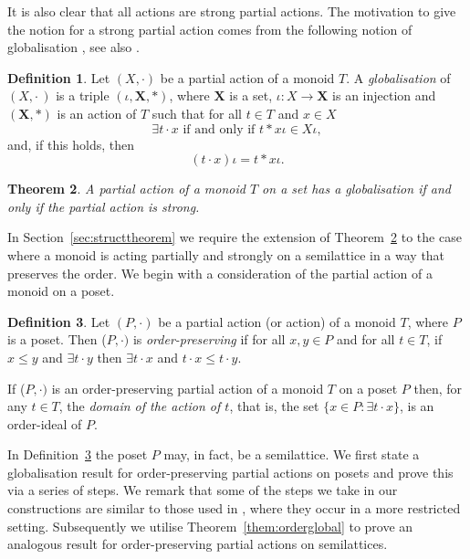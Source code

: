 \documentclass[12pt]{amsart}
\newtheorem{them}{Theorem}[section]
\theoremstyle{definition}
\newtheorem{defn}[them]{Definition}
\theoremstyle{definition}
\numberwithin{them}{section}
\numberwithin{equation}{section}
\begin{document}
It is also clear that all actions are strong partial actions. The motivation to give the notion for a strong partial action comes from the following notion of globalisation \cite{meg:2004}, see also \cite{hollings:2007}.

\begin{defn} \label{defn:global}  Let $(X,\cdot)$ be a partial action of a monoid  $T$.   A {\em globalisation} of  $(X,\cdot\,)$ is  a triple $(\iota, \mathbf{X}, \ast)$, where  $\mathbf{X}$ is a set, $\iota:X\rightarrow \mathbf{X}$ is an injection 
and $(\mathbf{X},\ast)$ is an action of   $T$  such that for all $t\in T$ and $x\in X$
\[\exists t\cdot x\mbox{ if and only if }t\ast x\iota\in X\iota,\]
and, if this holds, then
\[(t\cdot x)\iota=t\ast x\iota.\] \end{defn}

\begin{them}\cite{meg:2004,hollings:2007}\label{thm:strong} A partial action of a monoid $T$ on a set has a globalisation if and only if the partial action is strong.
\end{them}

In Section~\ref{sec:structtheorem}    we require the extension  of  Theorem~\ref{thm:strong} to the case where a monoid is acting partially and strongly on a semilattice in a way that preserves the  order.  We begin with a consideration of the partial action of a monoid on a poset.

\begin{defn} \label{defn:opaction}  Let $(P, \cdot)$ be a partial action (or action) of a monoid $T$, where $P$ is a poset.   Then ($P,\cdot)$ is  {\em order-preserving }
if  for all $x,y\in P$ and for all $t\in T$, 
if $x\leq y$ and $\exists t\cdot y$ then $\exists t\cdot x$ and $t\cdot x\leq t\cdot y$.
\end{defn}

 If  ($P,\cdot)$ is an  order-preserving partial action of a monoid $T$ on a poset $P$ then, for any $t\in T$, the {\em domain of the action of $t$}, that is, the set $\{ x\in P:\exists t\cdot x\}$, is an order-ideal of $P$. 

In Definition~\ref{defn:opaction} the poset $P$ may, in fact,  be a semilattice. We first state a globalisation result for order-preserving partial actions on posets and prove this via a series of steps. We remark that some of the steps we take in our constructions  are similar to those used in \cite[Section 4]{kudryavtseva:2015}, where they occur in  a more restricted setting. Subsequently we utilise Theorem~\ref{them:orderglobal} to prove an analogous result for order-preserving partial actions on semilattices. 
\end{document}
